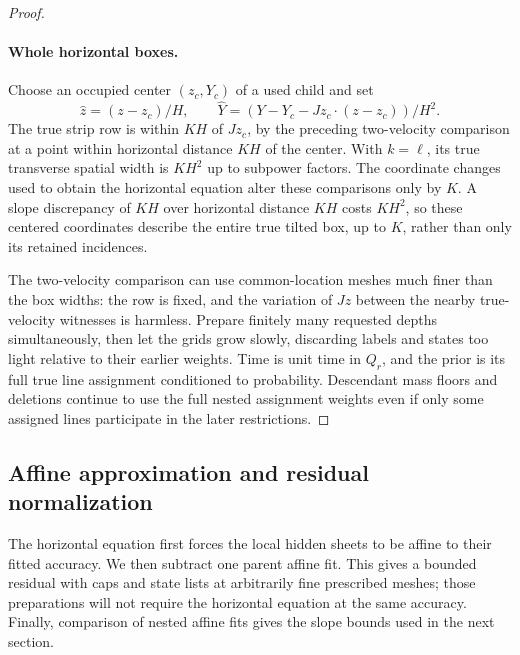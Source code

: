 \begin{proof}
\paragraph{Whole horizontal boxes.}
Choose an occupied center \((z_c,Y_c)\) of a used child and set
\begin{equation}\label{a06:centered-horizontal-box}
 \widehat z=(z-z_c)/H,\qquad
 \widehat Y=(Y-Y_c-Jz_c\cdot(z-z_c))/H^2.
\end{equation}
The true strip row is within \(KH\) of \(Jz_c\), by the
preceding two-velocity comparison at a point within horizontal
distance \(KH\) of the center.  With \(k=\ell\), its true
transverse spatial width is \(KH^2\) up to subpower factors.
The coordinate changes used to obtain the horizontal equation
alter these comparisons only by \(K\).  A slope discrepancy
of \(KH\) over horizontal distance \(KH\) costs \(KH^2\),
so these centered coordinates describe the entire true tilted
box, up to \(K\), rather than only its retained incidences.

The two-velocity comparison can use common-location meshes much
finer than the box widths: the row is fixed, and the variation of
\(Jz\) between the nearby true-velocity witnesses is harmless.
Prepare finitely many requested depths simultaneously, then let
the grids grow slowly, discarding labels and states too light
relative to their earlier weights.  Time is unit time in \(Q_r\),
and the prior is its full true line assignment conditioned to
probability.  Descendant mass floors and deletions continue to use
the full nested assignment weights even if only some assigned lines
participate in the later restrictions.
\end{proof}

\subsection{Affine approximation and residual normalization}

The horizontal equation first forces the local hidden sheets to be
affine to their fitted accuracy.  We then subtract one parent affine
fit.  This gives a bounded residual with caps and state lists at
arbitrarily fine prescribed meshes; those preparations will not require
the horizontal equation at the same accuracy.  Finally, comparison of
nested affine fits gives the slope bounds used in the next section.

